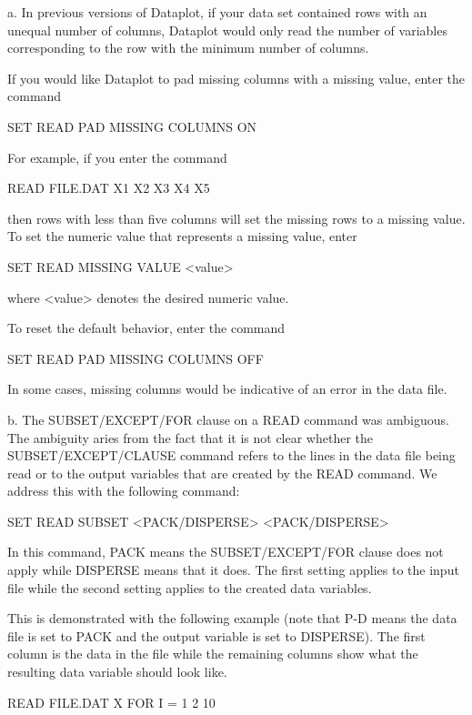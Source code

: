 {     a. In previous versions of Dataplot, if your data set contained
        rows with an unequal number of columns, Dataplot would only
        read the number of variables corresponding to the row
        with the minimum number of columns.

        If you would like Dataplot to pad missing columns with a
        missing value, enter the command

           SET READ PAD MISSING COLUMNS ON

        For example, if you enter the command

           READ FILE.DAT X1 X2 X3 X4 X5

        then rows with less than five columns will set the missing
        rows to a missing value.  To set the numeric value that
        represents a missing value, enter

           SET READ MISSING VALUE <value>

        where <value> denotes the desired numeric value.

        To reset the default behavior, enter the command

           SET READ PAD MISSING COLUMNS OFF

        In some cases, missing columns would be indicative of an
        error in the data file.

     b. The SUBSET/EXCEPT/FOR clause on a READ command was ambiguous.
        The ambiguity aries from the fact that it is not clear whether
        the SUBSET/EXCEPT/CLAUSE command refers to the lines in the
        data file being read or to the output variables that are
        created by the READ command.  We address this with the
        following command:

           SET READ SUBSET  <PACK/DISPERSE>   <PACK/DISPERSE>

        In this command, PACK means the SUBSET/EXCEPT/FOR clause
        does not apply while DISPERSE means that it does.  The
        first setting applies to the input file while the second
        setting applies to the created data variables.

        This is demonstrated with the following example (note that
        P-D means the data file is set to PACK and the output
        variable is set to DISPERSE).  The first column is the
        data in the file while the remaining columns show what
        the resulting data variable should look like.

                  READ FILE.DAT  X  FOR I = 1  2  10

}
